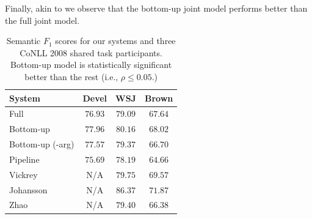 Finally, akin to \citet{riedel08collective} we observe that the bottom-up joint model performs better than the full joint model. %



\begin{table}[ht]
    \centering
    \begin{tabular}{|p{3.0cm}|c|c|c|}\hline
        System                    & Devel      & WSJ       & Brown \\\hline 
        Full                      & $76.93$  & $79.09$ & $67.64$ \\
        Bottom-up                 & $77.96$  & $80.16$ & $68.02$ \\
        Bottom-up (-arg)          & $77.57$  & $79.37$ & $66.70$ \\
        Pipeline                  & $75.69$  & $78.19$ & $64.66$ \\
        \hline
        Vickrey                   &   N/A    & $79.75$ & $69.57$ \\
        Johansson                 &   N/A    & $86.37$ & $71.87$ \\
        Zhao                      &   N/A    & $79.40$ & $66.38$ \\
        \hline
    \end{tabular}
    \caption{Semantic $F_1$ scores for our systems and three CoNLL 2008 shared 
    task participants. Bottom-up model is statistically significant better than 
    the rest (i.e., $\rho \le 0.05$.)} %
    \label{tbl:results}
\end{table}



